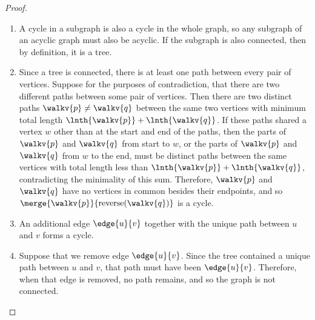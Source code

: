 \begin{proof}

\begin{enumerate}

\item A cycle in a subgraph is also a cycle in the whole graph, so any
  subgraph of an acyclic graph must also be acyclic.  If the subgraph
  is also connected, then by definition, it is a tree.

\item Since a tree is connected, there is at least one path between
  every pair of vertices.  Suppose for the purposes of contradiction,
  that there are two different paths between some pair of vertices.
  Then there are two distinct paths $\walkv{p} \neq \walkv{q}$ between
  the same two vertices with minimum total length $\lnth{\walkv{p}}+
  \lnth{\walkv{q}}$.  If these paths shared a vertex $w$
  other than at the start and end of the paths, then the parts of
  $\walkv{p}$ and $\walkv{q}$ from start to $w$, or the parts of
  $\walkv{p}$ and $\walkv{q}$ from $w$ to the end, must be
    distinct paths between the same vertices with total length less than
   $\lnth{\walkv{p}}+ \lnth{\walkv{q}}$, contradicting the minimality
    of this sum.  Therefore,  $\walkv{p}$ and $\walkv{q}$ have no
        vertices in common besides their endpoints, and so
        $\merge{\walkv{p}}{\text{reverse}(\walkv{q})}$ is a cycle.

\iffalse
  Beginning at $u$, let $x$ be the first vertex where
  the paths diverge, and let $y$ be the next vertex they share.  (For
  example, see Figure~\ref{fig:5L}.)  Then there are two paths from
  $x$ to~$y$ with no common edges, which defines a cycle.  This is a
  contradiction, since trees are acyclic.  Therefore, there is
  exactly one path between every pair of vertices.
\begin{figure}
\graphic{unique-path}
\caption{If there are two paths between $u$ and~$v$, the graph must
  contain a cycle.}
\label{fig:5L}
\end{figure}
\fi

\item An additional edge $\edge{u}{v}$ together with the unique path
  between $u$ and $v$ forms a cycle.

\item Suppose that we remove edge $\edge{u}{v}$.  Since the tree
  contained a unique path between $u$ and $v$, that path must have
  been $\edge{u}{v}$.  Therefore, when that edge is removed, no path
  remains, and so the graph is not connected.


\end{enumerate}
\end{proof}
